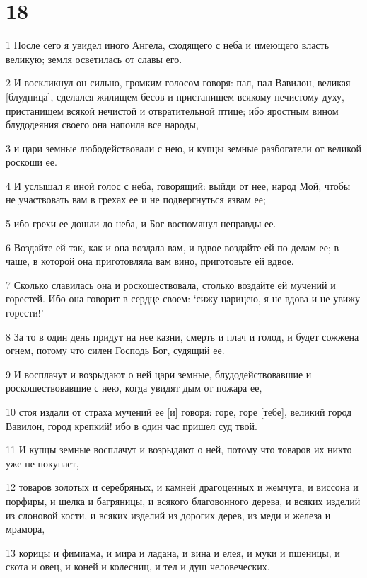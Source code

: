 \chapter{18}

\par 1 После сего я увидел иного Ангела, сходящего с неба и имеющего власть великую; земля осветилась от славы его.
\par 2 И воскликнул он сильно, громким голосом говоря: пал, пал Вавилон, великая [блудница], сделался жилищем бесов и пристанищем всякому нечистому духу, пристанищем всякой нечистой и отвратительной птице; ибо яростным вином блудодеяния своего она напоила все народы,
\par 3 и цари земные любодействовали с нею, и купцы земные разбогатели от великой роскоши ее.
\par 4 И услышал я иной голос с неба, говорящий: выйди от нее, народ Мой, чтобы не участвовать вам в грехах ее и не подвергнуться язвам ее;
\par 5 ибо грехи ее дошли до неба, и Бог воспомянул неправды ее.
\par 6 Воздайте ей так, как и она воздала вам, и вдвое воздайте ей по делам ее; в чаше, в которой она приготовляла вам вино, приготовьте ей вдвое.
\par 7 Сколько славилась она и роскошествовала, столько воздайте ей мучений и горестей. Ибо она говорит в сердце своем: `сижу царицею, я не вдова и не увижу горести!'
\par 8 За то в один день придут на нее казни, смерть и плач и голод, и будет сожжена огнем, потому что силен Господь Бог, судящий ее.
\par 9 И восплачут и возрыдают о ней цари земные, блудодействовавшие и роскошествовавшие с нею, когда увидят дым от пожара ее,
\par 10 стоя издали от страха мучений ее [и] говоря: горе, горе [тебе], великий город Вавилон, город крепкий! ибо в один час пришел суд твой.
\par 11 И купцы земные восплачут и возрыдают о ней, потому что товаров их никто уже не покупает,
\par 12 товаров золотых и серебряных, и камней драгоценных и жемчуга, и виссона и порфиры, и шелка и багряницы, и всякого благовонного дерева, и всяких изделий из слоновой кости, и всяких изделий из дорогих дерев, из меди и железа и мрамора,
\par 13 корицы и фимиама, и мира и ладана, и вина и елея, и муки и пшеницы, и скота и овец, и коней и колесниц, и тел и душ человеческих.

